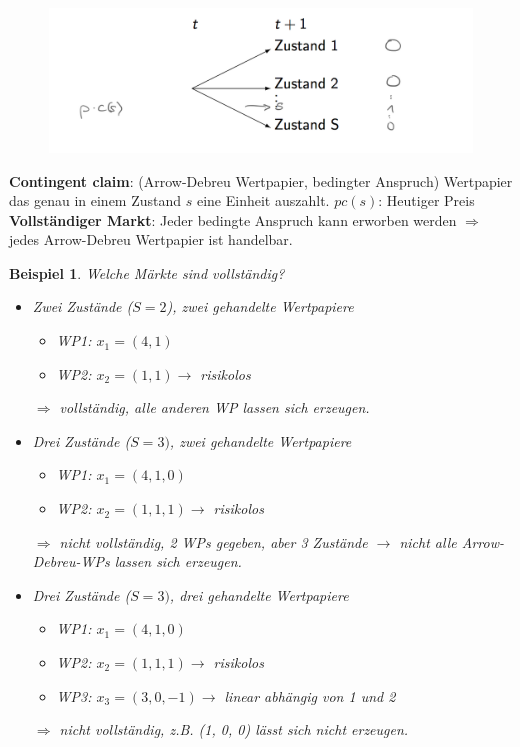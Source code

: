 \documentclass[12pt]{extreport} %
\theoremstyle{named}
\theoremstyle{nnamed}
\theoremstyle{itshape}
\theoremstyle{normal}
\newtheorem*{beispiel}{Beispiel}
\begin{document}
\begin{figure}[h!] \centering
	\includegraphics[scale=0.5]{img/p64}
\end{figure}

\textbf{Contingent claim}: (Arrow-Debreu Wertpapier, bedingter Anspruch) Wertpapier das genau in einem Zustand $s$ eine Einheit auszahlt. $pc(s)$: Heutiger Preis ~\\
\textbf{Vollständiger Markt}: Jeder bedingte Anspruch kann erworben werden $\Rightarrow$ jedes Arrow-Debreu Wertpapier ist handelbar.

\begin{beispiel}
	Welche Märkte sind vollständig?
	\begin{itemize}
		\item Zwei Zustände ($S = 2$), zwei gehandelte Wertpapiere
			\begin{itemize}
				\item WP1: $x_1 = (4, 1)$
				\item WP2: $x_2 = (1,1) \rightarrow$ risikolos
			\end{itemize}
			$\Rightarrow$ vollständig, alle anderen WP lassen sich erzeugen.
		\item Drei Zustände ($S = 3)$, zwei gehandelte Wertpapiere
			\begin{itemize}
				\item WP1: $x_1 = (4, 1, 0)$
				\item WP2: $x_2 = (1,1,1) \rightarrow$ risikolos
			\end{itemize}
			$\Rightarrow$ nicht vollständig, 2 WPs gegeben, aber 3 Zustände $\rightarrow$ nicht alle Arrow-Debreu-WPs lassen sich erzeugen.
		\item Drei Zustände ($S = 3)$, drei gehandelte Wertpapiere		
			\begin{itemize}
				\item WP1: $x_1 = (4, 1, 0)$
				\item WP2: $x_2 = (1,1, 1) \rightarrow$ risikolos
				\item WP3: $x_3 = (3,0,-1) \rightarrow$ linear abhängig von 1 und 2
			\end{itemize}
			$\Rightarrow$ nicht vollständig, z.B. (1, 0, 0) lässt sich nicht erzeugen.
	\end{itemize}	
\end{beispiel}
  
\end{document}
